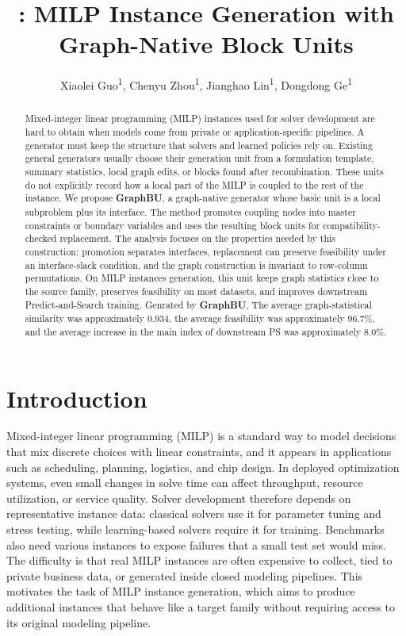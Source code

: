 \documentclass[letterpaper]{article}
\title{\method: MILP Instance Generation with Graph-Native Block Units}
\author{
Xiaolei Guo\textsuperscript{\rm 1},
Chenyu Zhou\textsuperscript{\rm 1},
Jianghao Lin\textsuperscript{\rm 1}\corresponding,
Dongdong Ge\textsuperscript{\rm 1}
}
\newcommand{\method}{\textbf{GraphBU}\xspace}
\begin{document}
\maketitle

\begin{abstract}
Mixed-integer linear programming (MILP) instances used for solver development are hard to obtain when models come from private or application-specific pipelines. A generator must keep the structure that solvers and learned policies rely on. Existing general generators usually choose their generation unit from a formulation template, summary statistics, local graph edits, or blocks found after recombination. These units do not explicitly record how a local part of the MILP is coupled to the rest of the instance. We propose \method, a graph-native generator whose basic unit is a local subproblem plus its interface. The method promotes coupling nodes into master constraints or boundary variables and uses the resulting block units for compatibility-checked replacement. The analysis focuses on the properties needed by this construction: promotion separates interfaces, replacement can preserve feasibility under an interface-slack condition, and the graph construction is invariant to row-column permutations. On MILP instances generation, this unit keeps graph statistics close to the source family, preserves feasibility on most datasets, and improves downstream Predict-and-Search training. Genrated by \method, The average graph-statistical similarity was approximately 0.934, the average feasibility was approximately 96.7\%, and the average increase in the main index of downstream PS was approximately 8.0\%.
\end{abstract}

\section{Introduction}

Mixed-integer linear programming (MILP) is a standard way to model decisions that mix discrete choices with linear constraints, and it appears in applications such as scheduling, planning, logistics, and chip design. In deployed optimization systems, even small changes in solve time can affect throughput, resource utilization, or service quality. Solver development therefore depends on representative instance data: classical solvers use it for parameter tuning and stress testing, while learning-based solvers require it for training\cite{bengio2021mlco,khalil2016learning,nair2020neuralmip,han2023predictsearch}. Benchmarks also need various instances to expose failures that a small test set would miss. The difficulty is that real MILP instances are often expensive to collect, tied to private business data, or generated inside closed modeling pipelines. This motivates the task of MILP instance generation, which aims to produce additional instances that behave like a target family without requiring access to its original modeling pipeline.
\end{document}
